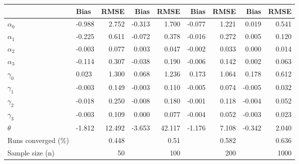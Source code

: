 
\begin{tabular}[t]{llrrrrrrr}
\toprule
  & Bias & RMSE & Bias & RMSE & Bias & RMSE & Bias & RMSE\\
\midrule
$\alpha_{0}$ & -0.988 & 2.752 & -0.313 & 1.700 & -0.077 & 1.221 & 0.019 & 0.541\\
$\alpha_{1}$ & -0.225 & 0.611 & -0.072 & 0.378 & -0.016 & 0.272 & 0.005 & 0.120\\
$\alpha_{2}$ & -0.003 & 0.077 & 0.003 & 0.047 & -0.002 & 0.033 & 0.000 & 0.014\\
$\alpha_{3}$ & -0.114 & 0.307 & -0.038 & 0.190 & -0.006 & 0.142 & 0.002 & 0.063\\
$\gamma_{0}$ & 0.023 & 1.300 & 0.068 & 1.236 & 0.173 & 1.064 & 0.178 & 0.612\\
$\gamma_{1}$ & -0.003 & 0.149 & -0.003 & 0.110 & -0.005 & 0.074 & -0.005 & 0.032\\
$\gamma_{2}$ & -0.018 & 0.250 & -0.008 & 0.180 & -0.001 & 0.118 & -0.004 & 0.052\\
$\gamma_{3}$ & -0.003 & 0.109 & 0.000 & 0.077 & -0.004 & 0.052 & -0.003 & 0.023\\
$\theta$ & -1.812 & 12.492 & -3.653 & 42.117 & -1.176 & 7.108 & -0.342 & 2.040\\
Runs converged (\%) &  & 0.448 &  & 0.51 &  & 0.582 &  & 0.636\\
Sample size (n) &  & 50 &  & 100 &  & 200 &  & 1000\\
\bottomrule
\end{tabular}
